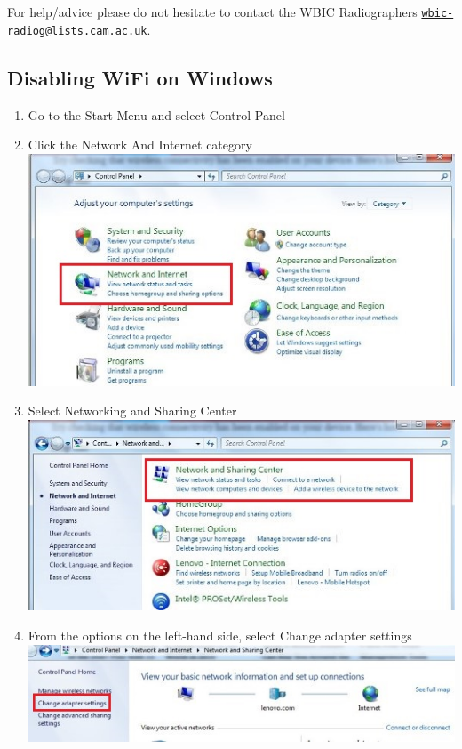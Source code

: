 \documentclass[
]{book}
\providecommand{\tightlist}{%
  \setlength{\itemsep}{0pt}\setlength{\parskip}{0pt}}
\begin{document}
For help/advice please do not hesitate to contact the WBIC Radiographers \href{mailto:wbic-radiog@lists.cam.ac.uk}{\nolinkurl{wbic-radiog@lists.cam.ac.uk}}.

\hypertarget{disabling-wifi-on-windows}{%
\subsection{Disabling WiFi on Windows}\label{disabling-wifi-on-windows}}

\begin{enumerate}
\def\labelenumi{\arabic{enumi}.}
\tightlist
\item
  Go to the Start Menu and select Control Panel
\item
  Click the Network And Internet category\\
  \includegraphics{images/scan_protocol/1.jpg}
\item
  Select Networking and Sharing Center\\
  \includegraphics{images/scan_protocol/2.jpg}
\item
  From the options on the left-hand side, select Change adapter settings\\
  \includegraphics{images/scan_protocol/3.jpg}

\end{enumerate}
\end{document}
